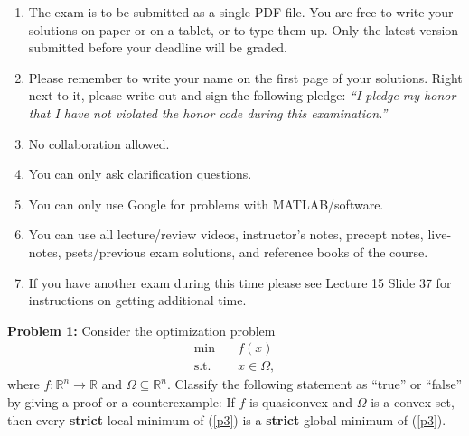 \documentclass[12pt]{article}
\begin{document}
\begin{titlepage}
\begin{enumerate}
\item The exam is to be submitted as a single PDF file. You are free to write your solutions on paper or on a tablet, or to type them up. Only the latest version submitted before your deadline will be graded.

\item Please remember to write your name on the first page of your solutions. Right next to it, please write out and sign the following pledge: \textit{``I pledge my honor that I have not violated the honor code during this examination.''}

\item No collaboration allowed. 

\item You can only ask clarification questions.

\item You can only use Google for problems with MATLAB/software.

\item You can use all lecture/review videos, instructor's notes, precept notes, live-notes, psets/previous exam solutions, and reference books of the course.

\item If you have another exam during this time please see Lecture 15 Slide 37 for instructions on getting additional time.

\end{enumerate}
\end{titlepage}

\newpage


{\bf Problem 1:} Consider the optimization problem
\begin{equation}\label{p3}
	\begin{aligned}
		\min \quad & f(x)\\
		\textrm{s.t.} \quad & x \in \Omega,
	\end{aligned}
\end{equation}
where $f: \mathbb{R}^n \rightarrow \mathbb{R}$ and $\Omega \subseteq \mathbb{R}^n$. Classify the following statement as ``true'' or ``false'' by giving a proof or a counterexample: If $f$ is quasiconvex and $\Omega$ is a convex set, then every {\bf strict} local minimum of (\ref{p3}) is a {\bf strict} global minimum of (\ref{p3}).
\end{document}
